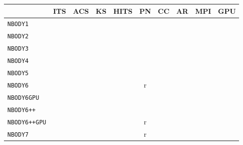 \let\V\checkmark
\begin{center}
    \begin{tabular}{|p{3cm}|c|c|c|c|c|c|c|c|c|} \hline
                     & ITS & ACS & KS & HITS & PN & CC & AR & MPI & GPU \\\hline
    \texttt{NBODY1}     & \V  &     &    &      &   &  &   &  &\\   
    \texttt{NBODY2}     &     & \V  &    & \V   &   &  &   &  &\\   
    \texttt{NBODY3}     & \V  &     & \V &      &   &  &   &  &\\   
    \texttt{NBODY4}     &     &     & \V & \V   &   &  &   &  &\\   
    \texttt{NBODY5}     & \V  & \V  & \V &      &   &  &   &  &\\   
    \texttt{NBODY6}     &     & \V  & \V & \V   & r &\V &\V&  &\\
    \texttt{NBODY6GPU}  &     & \V  & \V & \V   &\V &\V &\V&  &\V\\
    \texttt{NBODY6++}   &     & \V  & \V & \V   &   &\V& &\V&\\
    \texttt{NBODY6++GPU}&     & \V  & \V & \V   & r &\V& &\V&\V\\
    \texttt{NBODY7}     &     & \V  & \V & \V   & r &  &\V& &\V\\\hline
    \end{tabular}
\end{center}
\let\V\undefined
